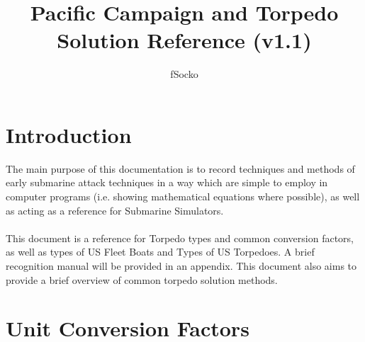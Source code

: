 \documentclass{article}
\author{fSocko}
\title{Pacific Campaign and Torpedo Solution Reference (v1.1)}
\begin{document}
\maketitle
\pagebreak
\tableofcontents
\pagebreak

\section{Introduction}

The main purpose of this documentation is to record techniques and methods of early submarine attack techniques in a way which are simple to employ in computer programs (i.e. showing mathematical equations where possible), as well as acting as a reference for Submarine Simulators.
\\ \\
This document is a reference for Torpedo types and common conversion factors, as well as types of US Fleet Boats and Types of US Torpedoes. A brief recognition manual will be provided in an appendix. This document also aims to provide a brief overview of common torpedo solution methods.

\section{Unit Conversion Factors}
\vspace{12pt}
\end{document}
